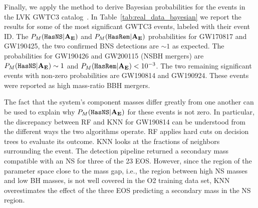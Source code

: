 Finally, we apply the method to derive Bayesian probabilities for the events in the \ac{LVK} \ac{GWTC3} catalog~\cite{LIGOScientific:2021djp}.  In Table~\ref{tab:real_data_bayesian} we report the
results for some of the most significant \ac{GWTC3} events, labeled with their event ID. The $P_M({{\tt HasNS}} |\bf{A_E})$ and $P_M({{\tt HasRem}} |\bf{A_E})$ probabilities for GW170817 and GW190425, the two
confirmed \ac{BNS} detections are $\sim 1$ as expected.  The probabilities for GW190426 and GW200115 (\ac{NSBH} mergers) are $P_M({{\tt HasNS}} |{\bf{A_E}}) \sim 1$ and $P_M({{\tt HasRem}} |{\bf{A_E}}) < 10^{-3}$.
The two remaining significant events with non-zero probabilities are GW190814 and GW190924. These events were reported as high mass-ratio BBH mergers. 

The fact that the system's component masses differ greatly from one another can be used to explain why $P_M({{\tt HasNS}} |\bf{A_E})$ for these events is not zero. In particular, the discrepancy
between \ac{RF} and \ac{KNN} for GW190814 can be understood from the different ways the two algorithms operate. \ac{RF} applies hard cuts on decision trees to evaluate its outcome. \ac{KNN}
looks at the fractions of neighbors surrounding the event. The detection pipeline returned a secondary mass compatible with an \ac{NS} for three of the 23 \ac{EOS}. However, since the region of
the parameter space close to the mass gap, i.e., the region between high \ac{NS} masses and low \ac{BH} masses, is not well covered in the \ac{O2} training data set, \ac{KNN} overestimates the
effect of the three \ac{EOS} predicting a secondary mass in the \ac{NS} region. 


